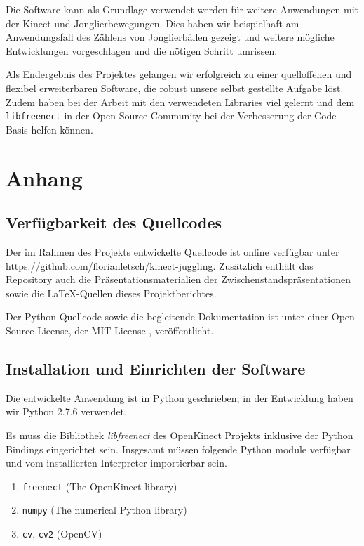 \documentclass[12pt,a4paper,ngerman]{scrartcl}
\begin{document}
Die Software kann als Grundlage verwendet werden für weitere Anwendungen mit
der Kinect und Jonglierbewegungen. Dies haben wir beispielhaft am Anwendungsfall
des Zählens von Jonglierbällen gezeigt und weitere mögliche Entwicklungen
vorgeschlagen und die nötigen Schritt umrissen.

Als Endergebnis des Projektes gelangen wir erfolgreich zu einer quelloffenen und flexibel
erweiterbaren Software, die robust unsere selbst gestellte Aufgabe löst. Zudem haben
bei der Arbeit mit den verwendeten Libraries viel gelernt und dem
\lstinline{libfreenect} in der Open Source Community bei der Verbesserung der
Code Basis helfen können.




\newpage

\section{Anhang}

\subsection{Verfügbarkeit des Quellcodes}

Der im Rahmen des Projekts entwickelte Quellcode ist online verfügbar unter 
\url{https://github.com/florianletsch/kinect-juggling}. Zusätzlich enthält
das Repository auch die Präsentationsmaterialien der Zwischenstandspräsentationen
sowie die LaTeX-Quellen dieses Projektberichtes.

Der Python-Quellcode sowie die begleitende Dokumentation ist unter einer Open Source License,
der MIT License \cite{mit-license}, veröffentlicht.

\subsection{Installation und Einrichten der Software}

Die entwickelte Anwendung ist in Python geschrieben, in der Entwicklung haben wir Python 2.7.6 verwendet.

Es muss die Bibliothek \textit{libfreenect} des OpenKinect Projekts \cite{openkinect} inklusive der Python Bindings eingerichtet sein. Insgesamt müssen folgende Python module verfügbar und vom installierten
Interpreter importierbar sein.

\begin{enumerate}
    \item \lstinline{freenect} (The OpenKinect library)
    \item \lstinline{numpy} (The numerical Python library)
    \item \lstinline{cv}, \lstinline{cv2} (OpenCV)
\end{enumerate}
\end{document}

